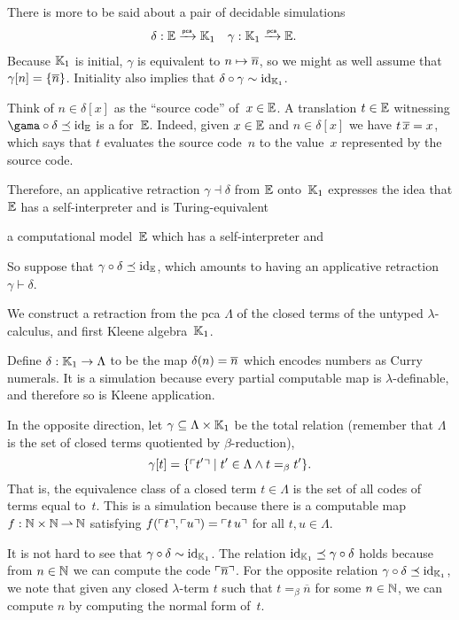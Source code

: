 There is more to be said about a pair of decidable simulations
%
\begin{align*}
  \delta &: \EE \pcato \klone
  &
  \gamma &: \klone \pcato \EE.
\end{align*}
%
Because $\klone$ is initial, $\gamma$ is equivalent to $n \mapsto \numeral{n}$, so we might as well assume that $\gamma[n] = \set{\numeral{n}}$. Initiality also implies that $\delta \circ \gamma \sim \id[\klone]$.

Think of $n \in \delta[x]$ as the ``source code'' of~$x \in \EE$.
%
A translation $t \in \EE$ witnessing $\gama \circ \delta \preceq \id[\EE]$ is a  for~$\EE$. Indeed, given $x \in \EE$ and $n \in \delta[x]$ we have $t \, \numeral{x} = x$, which says that $t$ evaluates the source code~$n$ to the value~$x$ represented by the source code.

Therefore, an applicative retraction $\gamma \dashv \delta$ from $\EE$ onto~$\klone$ expresses the idea that $\EE$ has a self-interpreter and is Turing-equivalent

 a computational model~$\EE$ which has a self-interpreter and 

So suppose that $\gamma \circ \delta \preceq \id[\EE]$, which amounts to having an applicative retraction $\gamma \vdash \delta$.




We construct a retraction from the pca $\Lambda$ of the closed terms of the untyped $\lambda$-calculus, and first Kleene algebra~$\klone$.

Define $\delta : \klone \to \Lambda$ to be the map $\delta(n) = \numeral{n}$ which encodes numbers as Curry numerals.
%
It is a simulation because every partial computable map is $\lambda$-definable, and therefore so is Kleene application.

In the opposite direction, let $\gamma \subseteq \Lambda \times \klone$ be the total relation (remember that $\Lambda$ is the set of closed terms quotiented by $\beta$-reduction),
%
\begin{equation*}
  \gamma[t] = \set{ \code{t'} \such t' \in \Lambda \land t =_\beta t' }.
\end{equation*}
%
That is, the equivalence class of a closed term $t \in \Lambda$ is the set of all codes of terms equal to~$t$.
This is a simulation because there is a computable map~$f : \NN \times \NN \parto \NN$ satisfying $f(\code{t}, \code{u}) = \code{t \, u}$ for all $t, u \in \Lambda$.

It is not hard to see that $\gamma \circ \delta \sim \id[\klone]$. The relation $\id[\klone] \preceq \gamma \circ \delta$ holds because from $n \in \NN$ we can compute the code $\code{\numeral{n}}$. For the opposite relation $\gamma \circ \delta \preceq \id[\klone]$, we note that given any closed $\lambda$-term $t$ such that $t =_\beta \overline{n}$ for some $n \in \NN$, we can compute $n$ by computing the normal form of~$t$.


